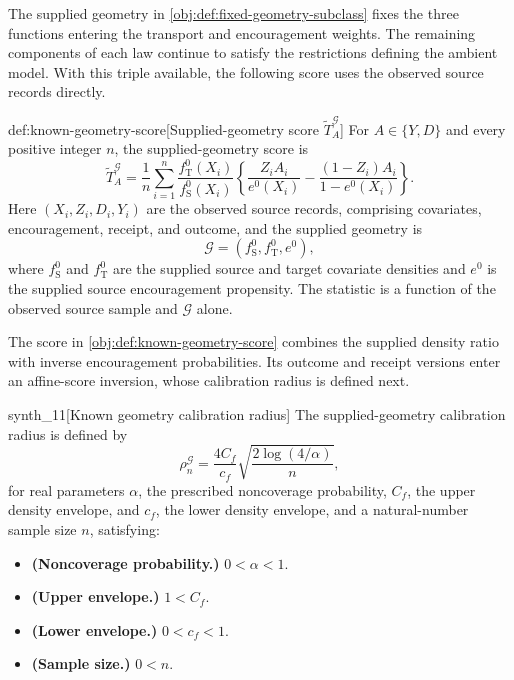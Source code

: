 \documentclass[11pt]{article}
\begin{document}
The supplied geometry  in \cref{obj:def:fixed-geometry-subclass} fixes the three functions entering the transport and encouragement weights. The remaining components of each law continue to satisfy the restrictions defining the ambient model. With this triple available, the following score uses the observed source records directly.

\begin{definitionv}{def:known-geometry-score}[Supplied-geometry score $\widetilde T_A^{\mathcal G}$]
For \(A\in\{Y,D\}\) and every positive integer \(n\), the supplied-geometry score is
\[
\widetilde T_A^{\mathcal G}
=
\frac1n\sum_{i=1}^n
\frac{f_{\mathrm T}^0(X_i)}{f_{\mathrm S}^0(X_i)}
\left\{
\frac{Z_iA_i}{e^0(X_i)}
-
\frac{(1-Z_i)A_i}{1-e^0(X_i)}
\right\}.
\]
Here \((X_i,Z_i,D_i,Y_i)\) are the observed source records, comprising covariates, encouragement, receipt, and outcome, and the supplied geometry is
\[
\mathcal G=(f_{\mathrm S}^0,f_{\mathrm T}^0,e^0),
\]
where \(f_{\mathrm S}^0\) and \(f_{\mathrm T}^0\) are the supplied source and target covariate densities and \(e^0\) is the supplied source encouragement propensity. The statistic is a function of the observed source sample and \(\mathcal G\) alone.
\end{definitionv}

The score  in \cref{obj:def:known-geometry-score} combines the supplied density ratio with inverse encouragement probabilities. Its outcome and receipt versions enter an affine-score inversion, whose calibration radius is defined next.

\begin{definitionv}{synth_11}[Known geometry calibration radius]
The supplied-geometry calibration radius is defined by
\[
\rho_n^{\mathcal G}
=
\frac{4C_f}{c_f}
\sqrt{\frac{2\log(4/\alpha)}{n}},
\]
for real parameters \(\alpha\), the prescribed noncoverage probability, \(C_f\), the upper density envelope, and \(c_f\), the lower density envelope, and a natural-number sample size \(n\), satisfying:
\begin{itemize}
\item \textbf{(Noncoverage probability.)} \(0<\alpha<1\).
\item \textbf{(Upper envelope.)} \(1<C_f\).
\item \textbf{(Lower envelope.)} \(0<c_f<1\).
\item \textbf{(Sample size.)} \(0<n\).
\end{itemize}
\end{definitionv}
\end{document}
